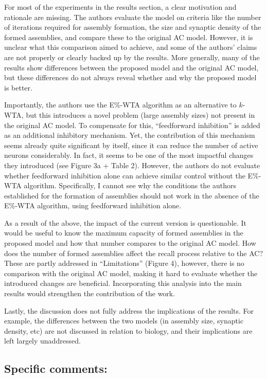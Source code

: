 \documentclass[a4paper, 11pt]{article}
\begin{document}
For most of the experiments in the results section, a clear motivation and rationale are missing. The authors evaluate the model on criteria like the number of iterations required for assembly formation, the size and synaptic density of the formed assemblies, and compare these to the original AC model. However, it is unclear what this comparison aimed to achieve, and some of the authors' claims are not properly or clearly backed up by the results. More generally, many of the results show differences between the proposed model and the original AC model, but these differences do not always reveal whether and why the proposed model is better.

Importantly, the authors use the E\%-WTA algorithm as an alternative to $k$-WTA, but this introduces a novel problem (large assembly sizes) not present in the original AC model. To compensate for this, ``feedforward inhibition'' is added as an additional inhibitory mechanism. Yet, the contribution of this mechanism seems already quite significant by itself, since it can reduce the number of active neurons considerably. In fact, it seems to be one of the most impactful changes they introduced (see Figure 3a + Table 2). However, the authors do not evaluate whether feedforward inhibition alone can achieve similar control without the E\%-WTA algorithm. Specifically, I cannot see why the conditions the authors established for the formation of assemblies should not work in the absence of the E\%-WTA algorithm, using feedforward inhibition alone.

As a result of the above, the impact of the current version is questionable. It would be useful to know the maximum capacity of formed assemblies in the proposed model and how that number compares to the original AC model. How does the number of formed assemblies affect the recall process relative to the AC? These are partly addressed in ``Limitations'' (Figure 4), however, there is no comparison with the original AC model, making it hard to evaluate whether the introduced changes are beneficial. Incorporating this analysis into the main results would strengthen the contribution of the work.

Lastly, the discussion does not fully address the implications of the results. For example, the differences between the two models (in assembly size, synaptic density, etc) are not discussed in relation to biology, and their implications are left largely unaddressed.

\subsection*{Specific comments:}
\end{document}
